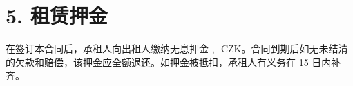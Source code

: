 \section*{5. 租赁押金}
在签订本合同后，承租人向出租人缴纳无息押金 \DepositAmount,- CZK。合同到期后如无未结清的欠款和赔偿，该押金应全额退还。如押金被抵扣，承租人有义务在 15 日内补齐。
